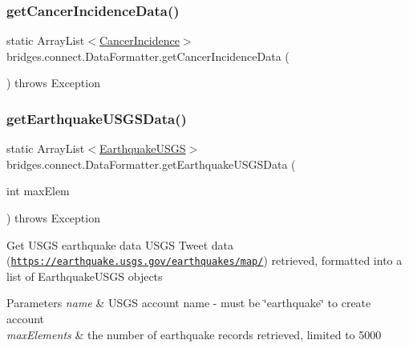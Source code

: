 \subsubsection{\texorpdfstring{get\+Cancer\+Incidence\+Data()}{getCancerIncidenceData()}}
{\footnotesize\ttfamily static Array\+List$<$\mbox{\hyperlink{classbridges_1_1data__src__dependent_1_1_cancer_incidence}{Cancer\+Incidence}}$>$ bridges.\+connect.\+Data\+Formatter.\+get\+Cancer\+Incidence\+Data (\begin{DoxyParamCaption}{ }\end{DoxyParamCaption}) throws Exception\hspace{0.3cm}{\ttfamily [static]}}

\mbox{\label{classbridges_1_1connect_1_1_data_formatter_a31f1f3e398fbf7225c790dbbbde238dd}} 
\subsubsection{\texorpdfstring{get\+Earthquake\+U\+S\+G\+S\+Data()}{getEarthquakeUSGSData()}}
{\footnotesize\ttfamily static Array\+List$<$\mbox{\hyperlink{classbridges_1_1data__src__dependent_1_1_earthquake_u_s_g_s}{Earthquake\+U\+S\+GS}}$>$ bridges.\+connect.\+Data\+Formatter.\+get\+Earthquake\+U\+S\+G\+S\+Data (\begin{DoxyParamCaption}\item[{int}]{max\+Elem }\end{DoxyParamCaption}) throws Exception\hspace{0.3cm}{\ttfamily [static]}}

Get U\+S\+GS earthquake data U\+S\+GS Tweet data (\href{https://earthquake.usgs.gov/earthquakes/map/}{\tt https\+://earthquake.\+usgs.\+gov/earthquakes/map/}) retrieved, formatted into a list of Earthquake\+U\+S\+GS objects


\begin{DoxyParams}{Parameters}
{\em name} & U\+S\+GS account name -\/ must be \char`\"{}earthquake\char`\"{} to create account \\
\hline
{\em max\+Elements} & the number of earthquake records retrieved, limited to 5000 \\
\hline
\end{DoxyParams}

